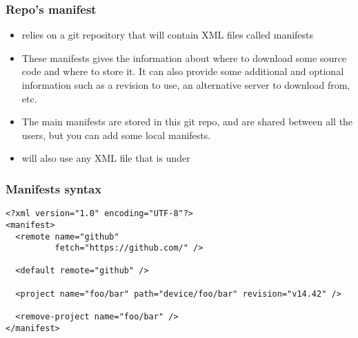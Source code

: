 \begin{frame}
  \frametitle{Repo's manifest}
  \begin{itemize}
  \item {} relies on a git repository that will contain XML
    files called manifests
  \item These manifests gives the information about where to download
    some source code and where to store it. It can also provide some
    additional and optional information such as a revision to use, an
    alternative server to download from, etc.
  \item The main manifests are stored in this git repo, and are shared
    between all the users, but you can add some local manifests.
  \item {} will also use any XML file that is under
  \end{itemize}
\end{frame}

\begin{frame}[fragile]
  \frametitle{Manifests syntax}
\begin{verbatim}
<?xml version="1.0" encoding="UTF-8"?>
<manifest>
  <remote name="github"
          fetch="https://github.com/" />

  <default remote="github" />

  <project name="foo/bar" path="device/foo/bar" revision="v14.42" />

  <remove-project name="foo/bar" />
</manifest>
\end{verbatim}
\end{frame}
